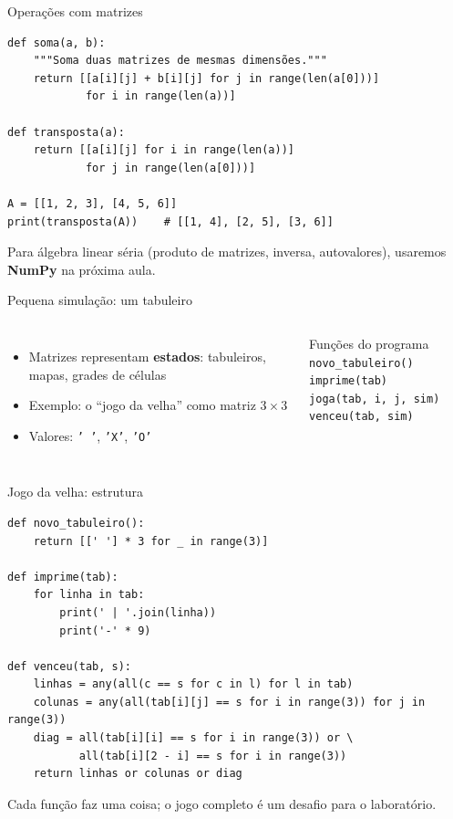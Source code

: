 \documentclass[aspectratio=169,10pt,t]{beamer}
\begin{document}
\begin{frame}[fragile]{Operações com matrizes}
\begin{lstlisting}
def soma(a, b):
    """Soma duas matrizes de mesmas dimensões."""
    return [[a[i][j] + b[i][j] for j in range(len(a[0]))]
            for i in range(len(a))]

def transposta(a):
    return [[a[i][j] for i in range(len(a))]
            for j in range(len(a[0]))]

A = [[1, 2, 3], [4, 5, 6]]
print(transposta(A))    # [[1, 4], [2, 5], [3, 6]]
\end{lstlisting}
  \small Para álgebra linear séria (produto de matrizes, inversa, autovalores), usaremos \textbf{NumPy} na próxima aula.
\end{frame}

\begin{frame}{Pequena simulação: um tabuleiro}
  \begin{columns}[T]
    \begin{itemize}
      \item Matrizes representam \textbf{estados}: tabuleiros, mapas, grades de células
      \item Exemplo: o ``jogo da velha'' como matriz \(3\times3\)
      \item Valores: \texttt{' '}, \texttt{'X'}, \texttt{'O'}
    \end{itemize}
    \begin{block}{Funções do programa}
      \small
      \texttt{novo\_tabuleiro()}\\
      \texttt{imprime(tab)}\\
      \texttt{joga(tab, i, j, sim)}\\
      \texttt{venceu(tab, sim)}
    \end{block}
  \end{columns}
\end{frame}

\begin{frame}[fragile]{Jogo da velha: estrutura}
\begin{lstlisting}
def novo_tabuleiro():
    return [[' '] * 3 for _ in range(3)]

def imprime(tab):
    for linha in tab:
        print(' | '.join(linha))
        print('-' * 9)

def venceu(tab, s):
    linhas = any(all(c == s for c in l) for l in tab)
    colunas = any(all(tab[i][j] == s for i in range(3)) for j in range(3))
    diag = all(tab[i][i] == s for i in range(3)) or \
           all(tab[i][2 - i] == s for i in range(3))
    return linhas or colunas or diag
\end{lstlisting}
  \small Cada função faz uma coisa; o jogo completo é um desafio para o laboratório.
\end{frame}
\end{document}
